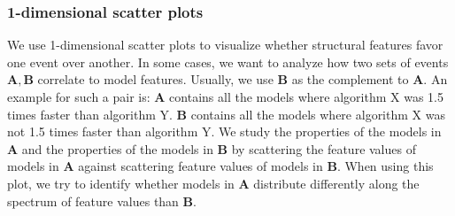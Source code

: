 \subsubsection*{1-dimensional scatter plots} \label{plot:1Dscatter}
We use 1-dimensional scatter plots to visualize whether structural features favor one event over another.
In some cases, we want to analyze how two sets of events $\mathbf{A}, \mathbf{B}$ correlate to model features. 
Usually, we use $\mathbf{B}$ as the complement to $\mathbf{A}$.
An example for such a pair is: 
$\mathbf{A}$ contains all the models where algorithm X was 1.5 times faster than algorithm Y.
$\mathbf{B}$ contains all the models where algorithm X was not 1.5 times faster than algorithm Y.
We study the properties of the models in $\mathbf{A}$ and the properties of the models in $\mathbf{B}$ 
by scattering the feature values of models in $\mathbf{A}$ against scattering feature values of models in $\mathbf{B}$. 
When using this plot, we try to identify whether models in $\mathbf{A}$ distribute
differently along the spectrum of feature values than $\mathbf{B}$.


